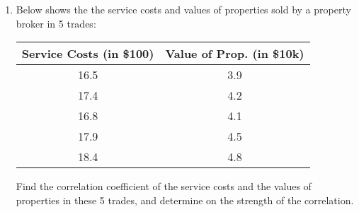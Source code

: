 \documentclass{report}
\begin{document}
\begin{multicols}{2}
\begin{enumerate}
    \item Below shows the the service costs and values of properties sold by a property
          broker in 5 trades:
          \begin{center}
            \begin{tabular}{|c|c|}
              \hline
              Service Costs (in \$100) & Value of Prop. (in \$10k) \\
              \hline
              16.5                     & 3.9                       \\
              17.4                     & 4.2                       \\
              16.8                     & 4.1                       \\
              17.9                     & 4.5                       \\
              18.4                     & 4.8                       \\
              \hline
            \end{tabular}
          \end{center}
          Find the correlation coefficient of the service costs and the values of properties in these 5 trades, and determine on the strength of the correlation.


\end{enumerate}
\end{multicols}
\end{document}
